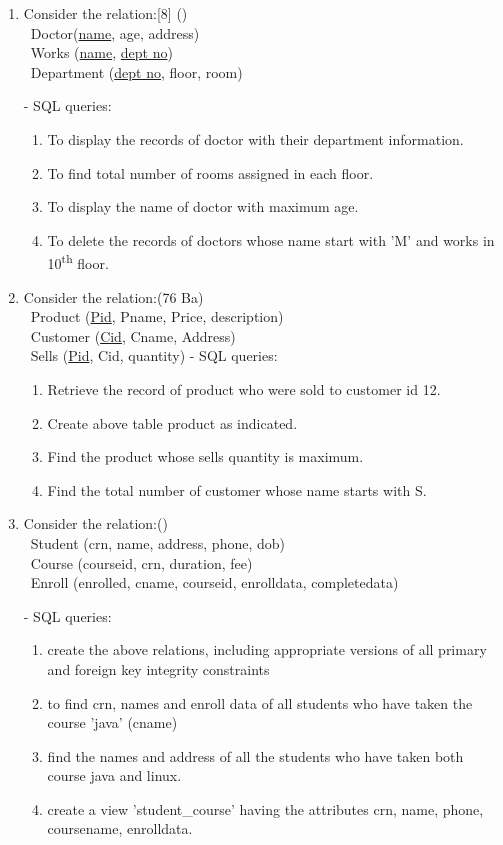 \documentclass[12pt]{article}
\newcommand{\enter}{\\\textcolor{white}{1}}
\begin{document}
\begin{enumerate}
    \item Consider the relation:\hfill[8] ()
        \enter Doctor(\underline{name}, age, address)
        \enter Works (\underline{name}, \underline{dept no})
        \enter Department (\underline{dept no}, floor, room)
        
        - SQL queries: 
        \begin{enumerate}[noitemsep, topsep = 0pt, label = \alph*.]
            \item To display the records of doctor with their department information.
            \item To find total number of rooms assigned in each floor.
            \item To display the name of doctor with maximum age.
            \item To delete the records of doctors whose name start with 'M' and works in 10\textsuperscript{th} floor.
        \end{enumerate}

    \item Consider the relation:\hfill(76 Ba)
        \enter Product (\underline{Pid}, Pname, Price, description)
        \enter Customer (\underline{Cid}, Cname, Address)
        \enter Sells (\underline{Pid}, Cid, quantity)
        - SQL queries: 
        \begin{enumerate}[noitemsep, topsep = 0pt, label = \alph*.]
            \item Retrieve the record of product who were sold to customer id 12.
            \item Create above table product as indicated.
            \item Find the product whose sells quantity is maximum.
            \item Find the total number of customer whose name starts with S.
        \end{enumerate}

    \item Consider the relation:\hfill()
        \enter Student (crn, name, address, phone, dob)
        \enter Course (courseid, crn, duration, fee)
        \enter Enroll (enrolled, cname, courseid, enrolldata, completedata)
        
        - SQL queries:
        \begin{enumerate}[noitemsep, topsep = 0pt, label = \alph*.]
            \item create the above relations, including appropriate versions of all primary and foreign key integrity constraints
            \item to find crn, names and enroll data of all students who have taken the course 'java' (cname)
            \item find the names and address of all the students who have taken both course java and linux.
            \item create a view 'student\_course' having the attributes crn, name, phone, coursename, enrolldata.
        \end{enumerate}


\end{enumerate}
\end{document}
